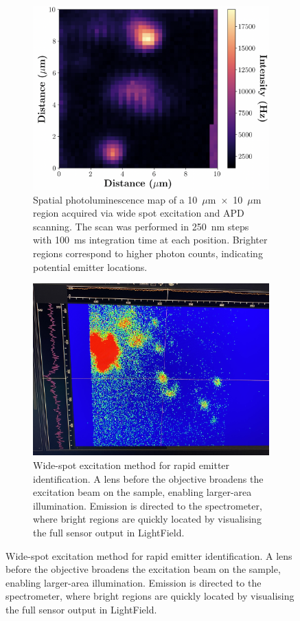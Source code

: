 \begin{figure}[h!]
    \centering

    \begin{subfigure}[b]{0.48\textwidth}
        \centering
        \includegraphics[width=\linewidth]{Figures/APDScan.png}
        \caption{Spatial photoluminescence map of a 10~$\mu$m~$\times$~10~$\mu$m region acquired via wide spot excitation and APD scanning. The scan was performed in 250~nm steps with 100~ms integration time at each position. Brighter regions correspond to higher photon counts, indicating potential emitter locations.}
        \label{fig:apd-scan}
    \end{subfigure}
    \hfill
    \begin{subfigure}[b]{0.48\textwidth}
        \centering
        \includegraphics[width=\linewidth]{Figures/WideFieldExcitation.jpg}
        \caption{Wide-spot excitation method for rapid emitter identification. A lens before the objective broadens the excitation beam on the sample, enabling larger-area illumination. Emission is directed to the spectrometer, where bright regions are quickly located by visualising the full sensor output in LightField.}
        \label{fig:wide-field}
    \end{subfigure}


\end{figure}
